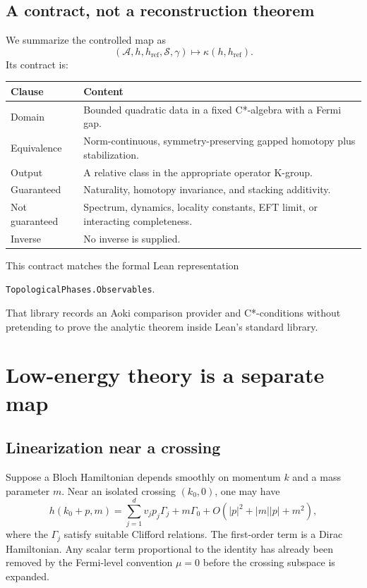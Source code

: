 \documentclass[12pt]{article}
\theoremstyle{definition}
\theoremstyle{remark}
\newcommand{\A}{\mathcal A}
\begin{document}
\subsection{A contract, not a reconstruction theorem}

We summarize the controlled map as
\[
(\A,h,h_{\mathrm{ref}},\mathcal S,\gamma)
\longmapsto
\kappa(h,h_{\mathrm{ref}}).
\]
Its contract is:

\begin{center}
\begin{tabular}{p{}p{}}
\toprule
Clause & Content \\
\midrule
Domain & Bounded quadratic data in a fixed C*-algebra with a Fermi gap.\\
Equivalence & Norm-continuous, symmetry-preserving gapped homotopy plus stabilization.\\
Output & A relative class in the appropriate operator K-group.\\
Guaranteed & Naturality, homotopy invariance, and stacking additivity.\\
Not guaranteed & Spectrum, dynamics, locality constants, EFT limit, or interacting completeness.\\
Inverse & No inverse is supplied.\\
\bottomrule
\end{tabular}
\end{center}

This contract matches the formal Lean representation
\begin{center}
\texttt{TopologicalPhases.Observables}.
\end{center}
That library records an Aoki comparison provider and C*-conditions without
pretending to prove the analytic theorem inside Lean's standard library.

\section{Low-energy theory is a separate map}

\subsection{Linearization near a crossing}

Suppose a Bloch Hamiltonian depends smoothly on momentum $k$ and a mass
parameter $m$.
Near an isolated crossing $(k_0,0)$, one may have
\[
h(k_0+p,m)
=
\sum_{j=1}^d v_jp_j\Gamma_j
+m\Gamma_0
+O(|p|^2+|m||p|+m^2),
\]
where the $\Gamma_j$ satisfy suitable Clifford relations.
The first-order term is a Dirac Hamiltonian.
Any scalar term proportional to the identity has already been removed by the
Fermi-level convention $\mu=0$ before the crossing subspace is expanded.
\end{document}
